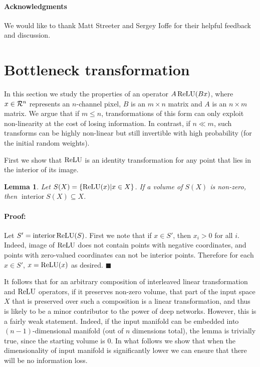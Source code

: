 \documentclass[10pt,twocolumn,letterpaper]{article}
\def\real{{\cal R}}
\newenvironment{proof}{\paragraph{Proof:}}{$\blacksquare$}
\DeclareMathOperator{\reluop}{ReLU}
\def\relu{\ensuremath \reluop}
\newtheorem{lemma}{Lemma}
\begin{document}
\paragraph{Acknowledgments} We would like to thank Matt Streeter and Sergey Ioffe for their helpful feedback and discussion.





\appendix
%
\def\vecs{{s_1,\dots,s_m}}
\def\interior{\operatorname{interior}}

\section{Bottleneck transformation}
\label{sec:appendix_bottle}

%
%
%
%

In this section we study the properties of an operator $A\relu (B x)$, where $x\in \real^n$ represents an $n$-channel pixel, $B$ is an $m \times n$ matrix and $A$ is an $n\times m$ matrix.
We argue that if $m \le n$, transformations of this form can only exploit non-linearity at the cost of losing information.
In contrast, if $n \ll m$, such transforms can be highly non-linear but still invertible with high probability (for the initial random weights).

First we show that $\relu$ is an identity transformation for any point that lies in the interior of its image.
\begin{lemma}
Let $S(X) = \{\relu (x) | x \in X\} $. If a volume of $S(X)$ is non-zero, then  $\interior S(X) \subseteq X$.
\end{lemma}
\begin{proof}
Let $S' = \interior\relu (S)$. First we note that if $x \in S'$, then $x_i > 0$ for
all $i$. Indeed, image of $\relu$ does not contain points with negative coordinates, and points with zero-valued coordinates can not be interior points. Therefore for each $x \in S'$, $x = \relu (x)$
as desired.
\end{proof}

It follows that for an arbitrary composition of interleaved linear transformation and $\relu$ operators, if it preserves non-zero volume, that part of the input space $X$ that is preserved over such a composition is a linear transformation, and thus is likely to be a minor contributor to the power of deep networks.
However, this is a fairly weak statement. Indeed, if the input manifold can be embedded into $(n-1)$-dimensional manifold (out of $n$ dimensions total), the lemma is trivially true, since the starting volume is $0$. In what follows we show that when the dimensionality of input manifold is significantly lower we can ensure that there will be no information loss. 
\end{document}
